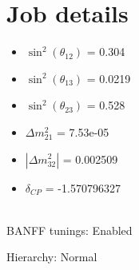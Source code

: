\documentclass[10pt,a4paper]{article}
\begin{document}
\section*{Job details}


\begin{minipage}[t]{0.5\textwidth}
\begin{itemize}
\item[] $\sin^2(\theta_{12})$ = 0.304
\item[] $\sin^2(\theta_{13})$ = 0.0219
\item[] $\sin^2(\theta_{23})$ = 0.528
\item[] $\Delta m^2_{21}$ = 7.53e-05
\item[] $|\Delta m^2_{32}|$ = 0.002509
\item[] $\delta_{CP}$ = -1.570796327
\end{itemize}
\end{minipage}
\\



BANFF tunings: Enabled

Hierarchy: Normal
\end{document}
